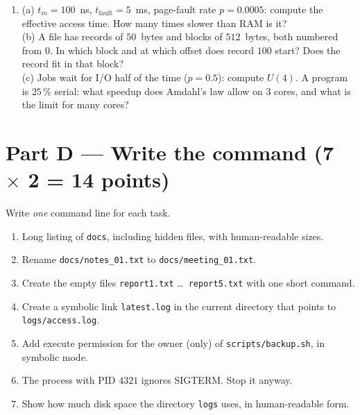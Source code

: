 \documentclass[11pt,a4paper]{article}
\begin{document}
\begin{enumerate}[leftmargin=1.8em,label=C\arabic*.]
\begin{center}
  \end{center}
  \item (a) $t_m = 100$~ns, $t_{\text{fault}} = 5$~ms, page-fault rate $p = 0.0005$: compute the effective access time. How many times slower than RAM is it? \\
  (b) A file has records of $50$~bytes and blocks of $512$~bytes, both numbered from $0$. In which block and at which offset does record $100$ start? Does the record fit in that block? \\
  (c) Jobs wait for I/O half of the time ($p = 0.5$): compute $U(4)$. A program is $25\,\%$ serial: what speedup does Amdahl's law allow on $3$ cores, and what is the limit for many cores? 
  \ans{6.0cm}
\end{enumerate}

\newpage
\section*{Part D --- Write the command \hfill (7 $\times$ 2 = 14 points)}
Write \emph{one} command line for each task.
\begin{enumerate}[leftmargin=1.8em,label=D\arabic*.]
  \item Long listing of \texttt{docs}, including hidden files, with human-readable sizes. \ans{0.9cm}
  \item Rename \texttt{docs/notes\_01.txt} to \texttt{docs/meeting\_01.txt}. \ans{0.9cm}
  \item Create the empty files \texttt{report1.txt} \dots\ \texttt{report5.txt} with one short command. \ans{0.9cm}
  \item Create a symbolic link \texttt{latest.log} in the current directory that points to \texttt{logs/access.log}. \ans{0.9cm}
  \item Add execute permission for the owner (only) of \texttt{scripts/backup.sh}, in symbolic mode. \ans{0.9cm}
  \item The process with PID $4321$ ignores SIGTERM. Stop it anyway. \ans{0.9cm}
  \item Show how much disk space the directory \texttt{logs} uses, in human-readable form. \ans{0.9cm}
\end{enumerate}
\end{document}
